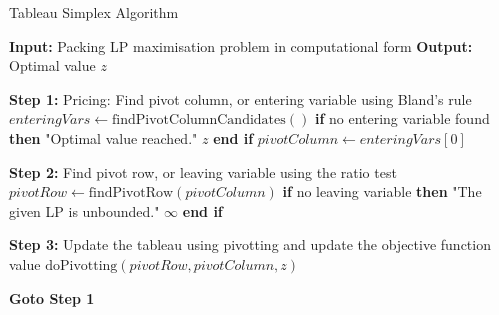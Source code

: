 \begin{algorithm}
    \caption{Tableau Simplex Algorithm}
    \begin{algorithmic}[1]
        \State \textbf{Input:} Packing LP maximisation problem in computational form
        \State \textbf{Output:} Optimal value $z$

        \State \textbf{Step 1:} Pricing: Find pivot column, or entering variable using Bland's rule
        \State \hspace{\algorithmicindent} $enteringVars \gets \text{findPivotColumnCandidates}()$
        \State \hspace{\algorithmicindent} \textbf{if} no entering variable found \textbf{then}
        \State \hspace{\algorithmicindent} \hspace{\algorithmicindent}  "Optimal value reached."
        \State \hspace{\algorithmicindent} \hspace{\algorithmicindent} \Return $z$
        \State \hspace{\algorithmicindent} \textbf{end if}
        \State \hspace{\algorithmicindent} $pivotColumn \gets enteringVars[0]$

        \State \textbf{Step 2:} Find pivot row, or leaving variable using the ratio test
        \State \hspace{\algorithmicindent} $pivotRow \gets \text{findPivotRow}(pivotColumn)$
        \State \hspace{\algorithmicindent} \textbf{if} no leaving variable \textbf{then}
        \State \hspace{\algorithmicindent} \hspace{\algorithmicindent}  "The given LP is unbounded."
        \State \hspace{\algorithmicindent} \hspace{\algorithmicindent} \Return $\infty$
        \State \hspace{\algorithmicindent} \textbf{end if}

        \State \textbf{Step 3:} Update the tableau using pivotting and update the objective function value
        \State \hspace{\algorithmicindent} $\text{doPivotting}(pivotRow, pivotColumn, z)$

        \State \textbf{Goto Step 1}
    \end{algorithmic}
\end{algorithm}
